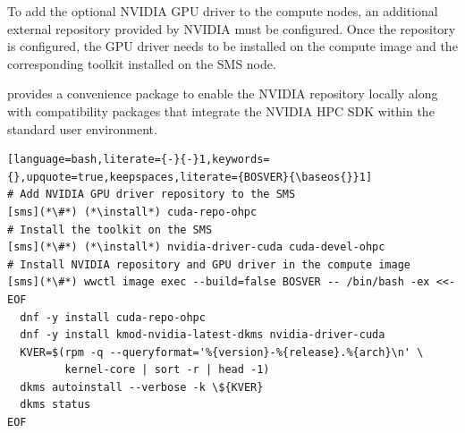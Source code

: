 To add the optional NVIDIA GPU driver to the compute nodes, an
additional external \pkgmgr{} repository provided by NVIDIA
must be configured. Once the repository is configured, the
GPU driver needs to be installed on the compute image and the
corresponding toolkit installed on the SMS node.

\OHPC{} provides a convenience package to enable the NVIDIA
repository locally along with compatibility packages that integrate
the NVIDIA HPC SDK within the standard \OHPC{} user environment.

\begin{lstlisting}[language=bash,literate={-}{-}1,keywords={},upquote=true,keepspaces,literate={BOSVER}{\baseos{}}1]
# Add NVIDIA GPU driver repository to the SMS
[sms](*\#*) (*\install*) cuda-repo-ohpc
# Install the toolkit on the SMS
[sms](*\#*) (*\install*) nvidia-driver-cuda cuda-devel-ohpc
# Install NVIDIA repository and GPU driver in the compute image
[sms](*\#*) wwctl image exec --build=false BOSVER -- /bin/bash -ex <<- EOF
  dnf -y install cuda-repo-ohpc
  dnf -y install kmod-nvidia-latest-dkms nvidia-driver-cuda
  KVER=$(rpm -q --queryformat='%{version}-%{release}.%{arch}\n' \
         kernel-core | sort -r | head -1)
  dkms autoinstall --verbose -k \${KVER}
  dkms status
EOF

\end{lstlisting}
